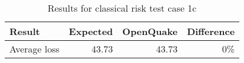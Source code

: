 \begin{table}[htbp]

\centering
\begin{tabular}{ l r r r }

\hline
\rowcolor{anti-flashwhite}
\bf{Result} & \bf{Expected} & \bf{OpenQuake} & \bf{Difference}\\
\hline
Average loss & 43.73 & 43.73 & 0\% \\
\hline
\end{tabular}

\caption{Results for classical risk test case 1c}
\label{tab:result-cr-1c}
\end{table}